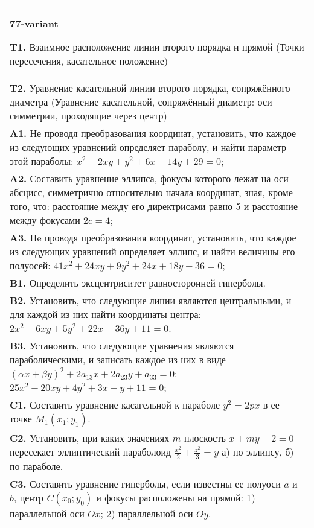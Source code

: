 \documentclass{article}
\begin{document}
\begin{tabular}{m{17cm}}
\textbf{77-variant}
\newline

\textbf{T1.} Взаимное расположение линии второго порядка и прямой (Точки пересечения, касательное положение) \\
\textbf{T2.} Уравнение касательной линии второго порядка, сопряжённого диаметра (Уравнение касательной, сопряжённый диаметр: оси симметрии, проходящие через центр) \\
\textbf{A1.} Не проводя преобразования координат, установить, что каждое из следующих уравнений определяет параболу, и найти параметр этой параболы: $x^2-2 x y+y^2+6 x-14 y+29=0$; \\
\textbf{A2.} Составить уравнение эллипса, фокусы которого лежат на оси абсцисс, симметрично относительно начала координат, зная, кроме того, что: расстояние между его директрисами равно 5 и расстояние между фокусами $2 c=4$; \\
\textbf{A3.} He проводя преобразования координат, установить, что каждое из следующих уравнений определяет эллипс, и найти величины его полуосей: $41 x^2+24 x y+9 y^2+24 x+18 y-36=0$; \\
\textbf{B1.} Определить эксцентриситет равносторонней гиперболы. \\
\textbf{B2.} Установить, что следующие линии являются центральными, и для каждой из них найти координаты центра: $2 x^2-6 x y+5 y^2+22 x-36 y+11=0$. \\
\textbf{B3.} Установить, что следующие уравнения являются параболическими, и записать каждое из них в виде $(\alpha x+\beta y)^2+2 a_{13} x+2 a_{23} y+a_{33}=0$: $25 x^2-20 x y+4 y^2+3 x-y+11=0$; \\
\textbf{C1.} Составить уравнение касагельной к параболе $y^2=2 p x$ в ее точке $M_1\left(x_1 ; y_1\right)$. \\
\textbf{C2.} Установить, при каких значениях $m$ плоскость $x+m y-2=0$ пересекает эллиптический параболоид $\frac{x^2}{2}+\frac{z^2}{3}=y$ а) по эллипсу, б) по параболе. \\
\textbf{C3.} Составить уравнение гиперболы, если известны ее полуоси $a$ и $b$, центр $C\left(x_0 ; y_0\right)$ и фокусы расположены на прямой: 1) параллельной оси $O x$; 2) параллельной оси $O y$. \\

\end{tabular}
\vspace{1cm}
\end{document}
